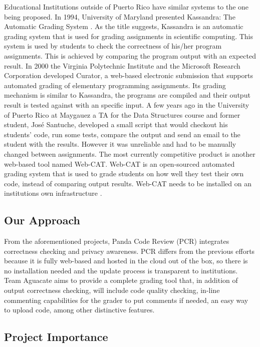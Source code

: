 Educational Institutions outside of Puerto Rico have similar systems to the one
being proposed. In 1994, University of Maryland presented Kassandra: The
Automatic Grading System \cite{Matt1994}. As the title suggests, Kassandra is an
automatic grading system that is used for grading assignments in scientific
computing. This system is used by students to check the correctness of his/her
program assignments. This is achieved by comparing the program output with an
expected result. In 2000 the Virginia Polytechnic Institute and the Microsoft
Research Corporation developed Curator, a web-based electronic submission that
supports automated grading of elementary programming assignments. \cite{Curator}
Its grading mechanism is similar to Kassandra, the programs are compiled and
their output result is tested against with an specific input. A few years ago in
the University of Puerto Rico at Maygauez a TA for the Data Structures course
and former student, José Santuche, developed a small script that would checkout
his students' code, run some tests, compare the output and send an email to the
student with the results. However it was unreliable and had to be manually
changed between assignments. The most currently competitive product is another
web-based tool named Web-CAT. Web-CAT is an open-sourced automated grading
system that is used to grade students on how well they test their own code,
instead of comparing output results. Web-CAT needs to be installed on an
institutions own infrastructure \cite{WebCat}.

\subsection{Our Approach}

From the aforementioned projects, Panda Code Review (PCR) integrates correctness
checking and privacy awareness. PCR differs from the previous efforts because it
is fully web-based and hosted in the cloud out of the box, so there is no
installation needed and the update process is transparent to institutions. Team
Aguacate aims to provide a complete grading tool that, in addition of output
correctness checking, will include code quality checking, in-line commenting
capabilities for the grader to put comments if needed, an easy way to upload
code, among other distinctive features.

\subsection{Project Importance}

